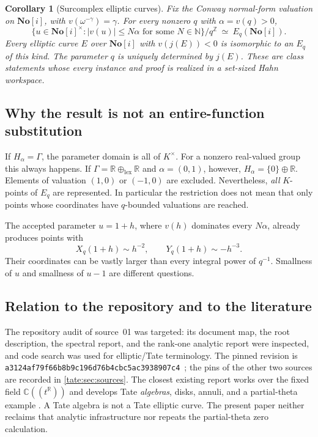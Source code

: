 \documentclass[11pt,letterpaper]{article}
\newtheorem{corollary}[corollary]{Corollary}
\theoremstyle{definition}
\newcommand{\C}{\mathbb C}
\newcommand{\R}{\mathbb R}
\newcommand{\Z}{\mathbb Z}
\newcommand{\N}{\mathbb N}
\newcommand{\No}{\mathbf{No}}
\newcommand{\sha}{\texttt{a3124af79f66b8b9c196d76b4cbc5ac3938907c4}}
\begin{document}
\begin{corollary}[Surcomplex elliptic curves]\label{tate:cor:surcomplex-main}
Fix the Conway normal-form valuation on $\No[i]$, with
$v(\omega^{-\gamma})=\gamma$. For every nonzero $q$ with $\alpha=v(q)>0$,
\begin{equation}
 \{u\in\No[i]^\times: |v(u)|\le N\alpha\text{ for some }N\in\N\}/q^\Z
       \ \simeq\ E_q(\No[i]).\label{tate:eq:No-main}
\end{equation}
Every elliptic curve $E$ over $\No[i]$ with $v(j(E))<0$ is isomorphic to
an $E_q$ of this kind. The parameter $q$ is uniquely determined by $j(E)$.
These are class statements whose every instance and proof is realized in
a set-sized Hahn workspace.
\end{corollary}

\subsection{Why the result is not an entire-function substitution}

If $H_\alpha=\Gamma$, the parameter domain is all of $K^\times$.
For a nonzero real-valued group this always happens. If
$\Gamma=\R\oplus_{\mathrm{lex}}\R$ and $\alpha=(0,1)$, however,
$H_\alpha=\{0\}\oplus\R$. Elements of valuation $(1,0)$ or $(-1,0)$
are excluded. Nevertheless, \emph{all} $K$-points of $E_q$ are represented.
In particular the restriction does not mean that only points whose
coordinates have $q$-bounded valuations are reached.

The accepted parameter $u=1+h$, where $v(h)$ dominates every $N\alpha$,
already produces points with
\[
 X_q(1+h)\sim h^{-2},\qquad Y_q(1+h)\sim-h^{-3}.
\]
Their coordinates can be vastly larger than every integral power of
$q^{-1}$. Smallness of $u$ and smallness of $u-1$ are different questions.

\subsection{Relation to the repository and to the literature}\label{tate:sec:position}

The repository audit of source~01 was targeted: its document map, the root
description, the spectral report, and the rank-one analytic report were
inspected, and code search was used for elliptic/Tate terminology. The
pinned revision is \sha\ \cite{Repo}; the pins of the other two sources are
recorded in \cref{tate:sec:sources}. The closest existing report works over the fixed
field $\C((t^\R))$ and develops Tate \emph{algebras}, disks, annuli, and a
partial-theta example \cite{RepoRankOne}. A Tate algebra is not a Tate
elliptic curve. The present paper neither reclaims that analytic
infrastructure nor repeats the partial-theta zero calculation.
\end{document}
